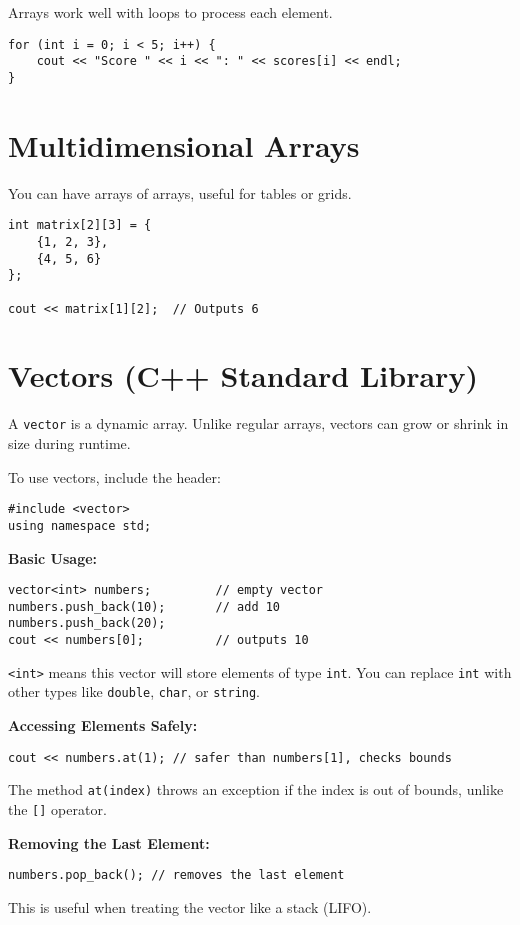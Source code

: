 \documentclass{article}
\begin{document}
Arrays work well with loops to process each element.

\begin{lstlisting}[style=cppstyle]
for (int i = 0; i < 5; i++) {
    cout << "Score " << i << ": " << scores[i] << endl;
}
\end{lstlisting}

\section{Multidimensional Arrays}

You can have arrays of arrays, useful for tables or grids.

\begin{lstlisting}[style=cppstyle]
int matrix[2][3] = {
    {1, 2, 3},
    {4, 5, 6}
};

cout << matrix[1][2];  // Outputs 6
\end{lstlisting}

\section{Vectors (C++ Standard Library)}

A \texttt{vector} is a dynamic array. Unlike regular arrays, vectors can grow or shrink in size during runtime.

To use vectors, include the header:
\begin{lstlisting}[style=cppstyle]
#include <vector>
using namespace std;
\end{lstlisting}

\textbf{Basic Usage:}
\begin{lstlisting}[style=cppstyle]
vector<int> numbers;         // empty vector
numbers.push_back(10);       // add 10
numbers.push_back(20);
cout << numbers[0];          // outputs 10
\end{lstlisting}

\texttt{<int>} means this vector will store elements of type \texttt{int}. You can replace \texttt{int} with other types like \texttt{double}, \texttt{char}, or \texttt{string}.


\textbf{Accessing Elements Safely:}
\begin{lstlisting}[style=cppstyle]
cout << numbers.at(1); // safer than numbers[1], checks bounds
\end{lstlisting}
The method \texttt{at(index)} throws an exception if the index is out of bounds, unlike the \texttt{[]} operator.

\textbf{Removing the Last Element:}
\begin{lstlisting}[style=cppstyle]
numbers.pop_back(); // removes the last element
\end{lstlisting}
This is useful when treating the vector like a stack (LIFO).
\end{document}
